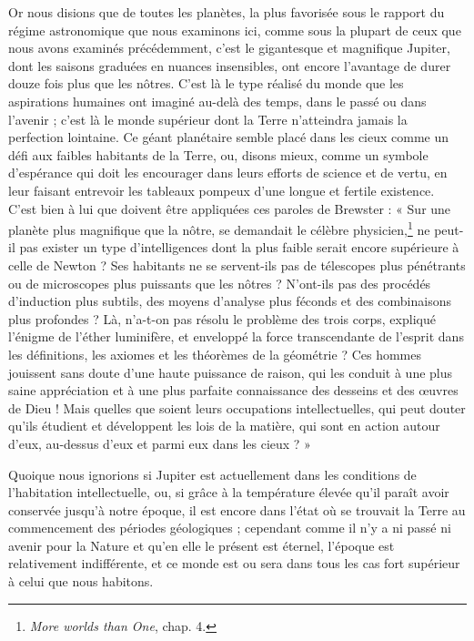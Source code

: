\documentclass[a4paper, 11pt, oneside]{article}
\begin{document}
Or nous disions que de toutes les planètes, la plus favorisée sous le rapport du régime astronomique que nous examinons ici, comme sous la plupart de ceux que nous avons examinés précédemment, c'est le gigantesque et magnifique Jupiter, dont les saisons graduées en nuances insensibles, ont encore l'avantage de durer douze fois plus que les nôtres. C'est là le type réalisé du monde que les aspirations humaines ont imaginé au-delà des temps, dans le passé ou dans l'avenir ; c'est là le monde supérieur dont la Terre n'atteindra jamais la perfection lointaine. Ce géant planétaire semble placé dans les cieux comme un défi aux faibles habitants de la Terre, ou, disons mieux, comme un symbole d'espérance qui doit les encourager dans leurs efforts de science et de vertu, en leur faisant entrevoir les tableaux pompeux d'une longue et fertile existence. C'est bien à lui que doivent être appliquées ces paroles de Brewster : « Sur une planète plus magnifique que la nôtre, se demandait le célèbre physicien,\footnote{\emph{More worlds than One}, chap. 4.} ne peut-il pas exister un type d'intelligences dont la plus faible serait encore supérieure à celle de Newton ? Ses habitants ne se servent-ils pas de télescopes plus pénétrants ou de microscopes plus puissants que les nôtres ? N'ont-ils pas des procédés d'induction plus subtils, des moyens d'analyse plus féconds et des combinaisons plus profondes ? Là, n'a-t-on pas résolu le problème des trois corps, expliqué l'énigme de l'éther luminifère, et enveloppé la force transcendante de l'esprit dans les définitions, les axiomes et les théorèmes de la géométrie ? Ces hommes jouissent sans doute d'une haute puissance de raison, qui les conduit à une plus saine appréciation et à une plus parfaite connaissance des desseins et des œuvres de Dieu ! Mais quelles que soient leurs occupations intellectuelles, qui peut douter qu'ils étudient et développent les lois de la matière, qui sont en action autour d'eux, au-dessus d'eux et parmi eux dans les cieux ? »

Quoique nous ignorions si Jupiter est actuellement dans les conditions de l'habitation intellectuelle, ou, si grâce à la température élevée qu'il paraît avoir conservée jusqu'à notre époque, il est encore dans l'état où se trouvait la Terre au commencement des périodes géologiques ; cependant comme il n'y a ni passé ni avenir pour la Nature et qu'en elle le présent est éternel, l'époque est relativement indifférente, et ce monde est ou sera dans tous les cas fort supérieur à celui que nous habitons.
\end{document}
